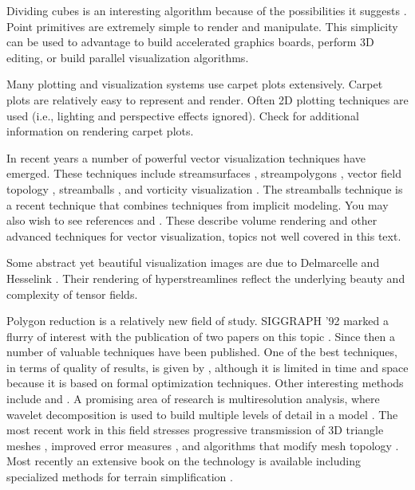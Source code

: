 Dividing cubes is an interesting algorithm because of the possibilities it suggests \cite{Cline88}. Point primitives are extremely simple to render and manipulate. This simplicity can be used to advantage to build accelerated graphics boards, perform 3D editing, or build parallel visualization algorithms.

Many plotting and visualization systems use carpet plots extensively. Carpet plots are relatively easy to represent and render. Often 2D plotting techniques are used (i.e., lighting and perspective effects ignored). Check \cite{Wang90} for additional information on rendering carpet plots.

In recent years a number of powerful vector visualization techniques have emerged. These techniques include streamsurfaces \cite{Hultquist92}, streampolygons \cite{Schroeder91}, vector field topology \cite{Helman91} \cite{Globus91}, streamballs \cite{Brill94}, and vorticity visualization \cite{Banks94}. The streamballs technique is a recent technique that combines techniques from implicit modeling. You may also wish to see references \cite{Crawfis92} \cite{vanWijk93} and \cite{Max94}. These describe volume rendering and other advanced techniques for vector visualization, topics not well covered in this text.

Some abstract yet beautiful visualization images are due to Delmarcelle and Hesselink \cite{Delmarcelle93}. Their rendering of hyperstreamlines reflect the underlying beauty and complexity of tensor fields.

Polygon reduction is a relatively new field of study. SIGGRAPH '92 marked a flurry of interest with the publication of two papers on this topic \cite{Schroeder92a} \cite{Turk92}. Since then a number of valuable techniques have been published. One of the best techniques, in terms of quality of results, is given by \cite{Hoppe93}, although it is limited in time and space because it is based on formal optimization techniques. Other interesting methods include \cite{Hinker93} and \cite{Rossignac93}. A promising area of research is multiresolution analysis, where wavelet decomposition is used to build multiple levels of detail in a model \cite{Eck95}. The most recent work in this field stresses progressive transmission of 3D triangle meshes \cite{Hoppe96}, improved error measures \cite{Garland97}, and algorithms that modify mesh topology \cite{Popovic97} \cite{Schroeder97}. Most recently an extensive book on the technology is available including specialized methods for terrain simplification \cite{Luebke02}.

